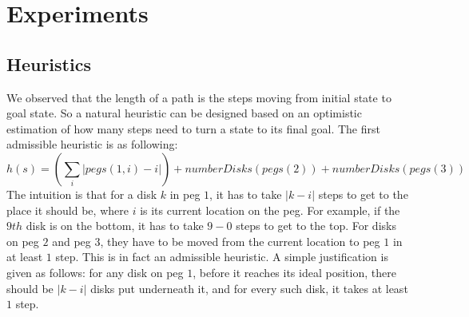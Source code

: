 \section{Experiments}\label{sec:exp}




\subsection{Heuristics}
We observed that the length of a path is the steps moving from initial state to goal state. So a natural heuristic can be designed based on an optimistic estimation of how many steps need to turn a state to its final goal. The first admissible heuristic is as following:
\[
h(s) = (\sum_i |pegs(1,i)-i| ) + numberDisks(pegs(2)) + numberDisks(pegs(3))
\]
The intuition is that for a disk $k$ in peg $1$, it has to take $|k-i|$ steps to get to the place it should be, where $i$ is its current location on the peg. For example, if the $9th$ disk is on the bottom, it has to take $9-0$ steps to get to the top. For disks on peg $2$ and peg $3$, they have to be moved from the current location to peg $1$ in at least $1$ step. This is in fact an admissible heuristic. A simple justification is given as follows: for any disk on peg $1$, before it reaches its ideal position, there should be $|k-i|$ disks put underneath it, and for every such disk, it takes at least $1$ step. 

